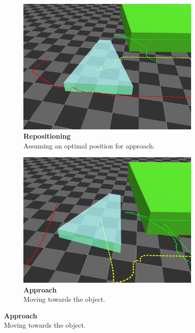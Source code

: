 \begin{figure}[H]
    \begin{subfigure}[b]{0.48\textwidth}
        \centering
        \captionsetup{justification=centering}
        \includegraphics[width=\textwidth]{figures/retrieval/repositioning}
        \caption{\textbf{Repositioning}\\Assuming an optimal position for approach.}
        \label{fig:retrieval-3-1}
    \end{subfigure}
    \begin{subfigure}[b]{0.48\textwidth}
        \centering
        \captionsetup{justification=centering}
        \includegraphics[width=\textwidth]{figures/retrieval/approach}
        \caption{\textbf{Approach}\\Moving towards the object.}

\end{subfigure}
\end{figure}
